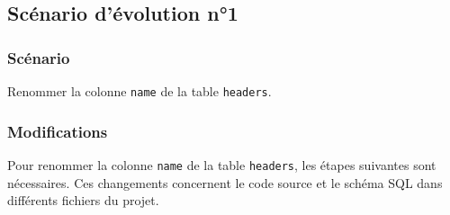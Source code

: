 \subsection{Scénario d'évolution n°1}

\subsubsection{Scénario}
Renommer la colonne \texttt{name} de la table \texttt{headers}.
\subsubsection{Modifications}
Pour renommer la colonne \texttt{name} de la table \texttt{headers}, les étapes suivantes sont nécessaires. Ces changements concernent le code source et le schéma SQL dans différents fichiers du projet.

